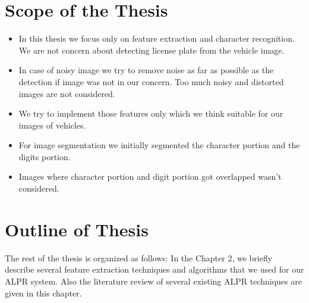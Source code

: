 \section{Scope of the Thesis}
\begin{itemize}
\item In this thesis we focus only on feature extraction and character recognition. We are not concern about detecting license plate from the vehicle image.
\item In case of noisy image we try to remove noise as far as possible as the detection if image was not in our concern. Too much noisy and distorted images are not considered.
\item We try to implement those features only which we think suitable for our images of vehicles.
\item For image segmentation we initially segmented the character portion and the digits portion.
\item Images where character portion and digit portion got overlapped wasn't considered. 
\end{itemize}
\section{Outline of Thesis}
The rest of the thesis is organized as follows:
In the Chapter 2, we briefly describe several feature extraction techniques and algorithms that we used for our ALPR system. Also the literature review of several existing ALPR techniques are given in this chapter.
\endinput